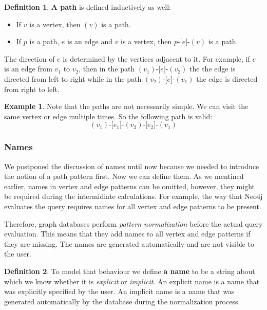 \documentclass[14pt]{constructor-thesis}
\theoremstyle{definition}
\newtheorem{definition}{Definition}
\newtheorem{example}{Example}
\newcommand{\pathstart}[1]{(#1)}
\newcommand{\pathhop}[3]{#1 \texttt{-[} #2 \texttt{]-} (#3)}
\begin{document}
\begin{definition}
  \textbf{A path} is defined inductively as well:
  \begin{itemize}
    \item If $v$ is a vertex, then $\pathstart{v}$ is a path.
    \item If $p$ is a path, $e$ is an edge and $v$ is a vertex, then $\pathhop{p}{e}{v}$ is a path.
  \end{itemize}
\end{definition}

The direction of $e$ is determined by the vertices adjacent to it. For example, if $e$ is an edge from $v_1$ to $v_2$, then in the path $\pathhop{\pathstart{v_1}}{e}{v_2}$ the the edge is directed from left to right while in the path $\pathhop{\pathstart{v_2}}{e}{v_1}$ the edge is directed from right to left.

\begin{example}
  Note that the paths are not necessarily simple. We can visit the same vertex or edge multiple times. So the following path is valid:
  $$\pathhop{\pathhop{\pathstart{v_1}}{e_1}{v_2}}{e_2}{v_1}$$
\end{example}

\subsubsection{Names}
\label{sec:GQL-names}

We postponed the discussion of names until now because we needed to introduce the notion of a path pattern first. Now we can define them. As we mentined earlier, names in vertex and edge patterns can be omitted, however, they might be required during the intermidiate calculations. For example, the way that Neo4j evaluates the query requires names for all vertex and edge patterns to be present. 

Therefore, graph databases perform \textit{pattern normalization} before the actual query evaluation. This means that they add names to all vertex and edge patterns if they are missing. The names are generated automatically and are not visible to the user.

\begin{definition}
  To model that behaviour we define \textbf{a name} to be a string about which we know whether it is \textit{explicit} or \textit{implicit}. An explicit name is a name that was explicitly specified by the user. An implicit name is a name that was generated automatically by the database during the normalization process.
\end{definition}
\end{document}
